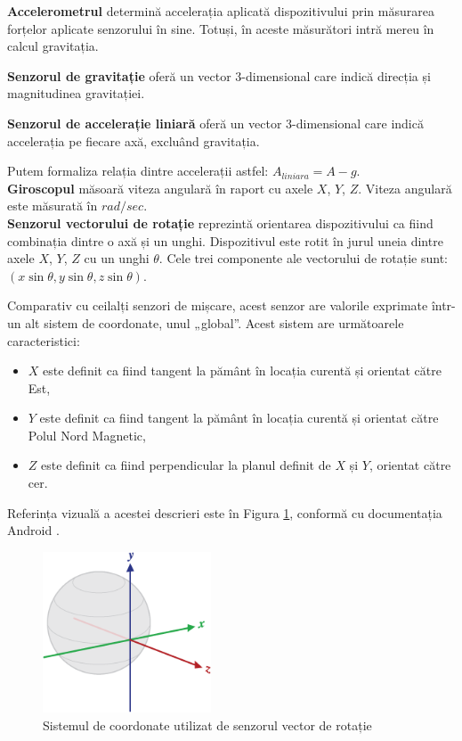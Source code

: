 \documentclass[12pt,a4paper]{article}
\begin{document}
	\textbf{Accelerometrul} determină accelerația aplicată dispozitivului prin măsurarea forțelor aplicate senzorului în sine. Totuși, în aceste măsurători intră mereu în calcul gravitația.

	\textbf{Senzorul de gravitație} oferă un vector 3-dimensional care indică direcția și magnitudinea gravitației.

	\textbf{Senzorul de accelerație liniară} oferă un vector 3-dimensional care indică accelerația pe fiecare axă, excluând gravitația.

	Putem formaliza relația dintre accelerații astfel:
	$A_{liniara} = A - g$.\\

	\textbf{Giroscopul} măsoară viteza angulară în raport cu axele $X$, $Y$, $Z$. Viteza angulară este măsurată în $rad/sec$.\\

	\textbf{Senzorul vectorului de rotație} reprezintă orientarea dispozitivului ca fiind combinația dintre o axă și un unghi. Dispozitivul este rotit în jurul uneia dintre axele $X$, $Y$, $Z$ cu un unghi $\theta$. Cele trei componente ale vectorului de rotație sunt: $(x \sin{\theta}, y \sin{\theta}, z \sin{\theta})$. 
	
	Comparativ cu ceilalți senzori de mișcare, acest senzor are valorile exprimate într-un alt sistem de coordonate, unul „global”.
	Acest sistem are următoarele caracteristici:
	\begin{itemize}
	\item $X$ este definit ca fiind tangent la pământ în locația curentă și orientat către Est,
	\item $Y$ este definit ca fiind tangent la pământ în locația curentă și orientat către Polul Nord Magnetic,
	\item $Z$ este definit ca fiind perpendicular la planul definit de $X$ și $Y$, orientat către cer.
	\end{itemize}
	
	Referința vizuală a acestei descrieri este în Figura \ref{fig:axis_globe}, conformă cu documentația Android \cite{DeveloperAndroid}.

\begin{figure}[h]
\centering
\includegraphics[width=5cm]{figures/axis_globe.png}
\caption{Sistemul de coordonate utilizat de senzorul vector de rotație}
\label{fig:axis_globe}
\end{figure}
\end{document}

